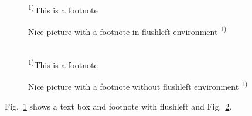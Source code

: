 \documentclass[11pt]{article}
\begin{document}
    \begin{figure}
        \caption{Nice picture with a footnote in flushleft environment \textsuperscript{1)}}
        \label{fig:pic_with_flushleft}
        \begin{flushleft}
            \footnotesize{\textsuperscript{1)}This is a footnote}
        \end{flushleft}
    \end{figure}

    \begin{figure}
        \caption{Nice picture with a footnote without flushleft environment \textsuperscript{1)}}
        \label{fig:pic_without_flushleft}
        \newline\\
        \footnotesize{\textsuperscript{1)}This is a footnote}
    \end{figure}

    Fig.~\ref{fig:pic_with_flushleft} shows a text box and footnote with flushleft and
    Fig.~\ref{fig:pic_without_flushleft}.
\end{document}
